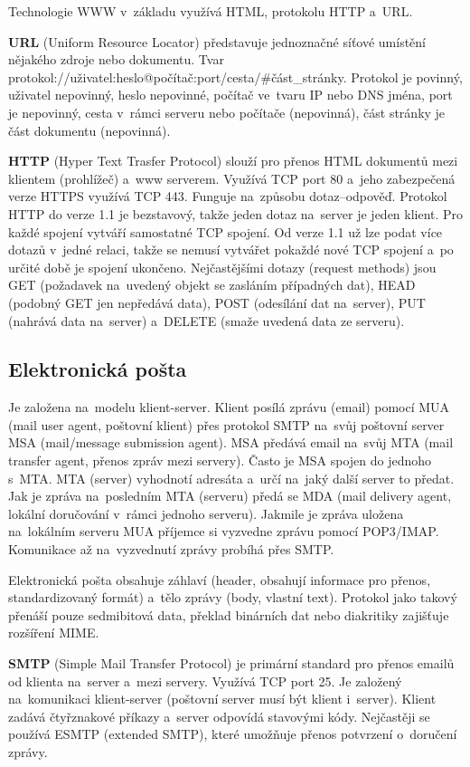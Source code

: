 Technologie WWW v~základu využívá HTML, protokolu HTTP a~URL.

\textbf{URL} (Uniform Resource Locator) představuje jednoznačné síťové umístění nějakého zdroje nebo dokumentu. Tvar protokol://uživatel:heslo@počítač:port/cesta/\#část\_stránky. Protokol je povinný, uživatel nepovinný, heslo nepovinné, počítač ve~tvaru IP nebo DNS jména, port je nepovinný, cesta v~rámci serveru nebo počítače (nepovinná), část stránky je část dokumentu (nepovinná).

\textbf{HTTP} (Hyper Text Trasfer Protocol) slouží pro přenos HTML dokumentů mezi klientem (prohlížeč) a~www serverem. Využívá TCP port 80 a~jeho zabezpečená verze HTTPS využívá TCP 443. Funguje na~způsobu dotaz--odpověď. Protokol HTTP do verze 1.1 je bezstavový, takže jeden dotaz na~server je jeden klient. Pro každé spojení vytváří samostatné TCP spojení. Od verze 1.1 už lze podat více dotazů v~jedné relaci, takže se nemusí vytvářet pokaždé nové TCP spojení a~po určité době je spojení ukončeno. Nejčastějšími dotazy (request methods) jsou GET (požadavek na~uvedený objekt se zasláním případných dat), HEAD (podobný GET jen nepředává data), POST (odesílání dat na~server), PUT (nahrává data na~server) a~DELETE (smaže uvedená data ze serveru).

\subsection{Elektronická pošta}

Je založena na~modelu klient-server. Klient posílá zprávu (email) pomocí MUA (mail user agent, poštovní klient) přes protokol SMTP na~svůj poštovní server MSA (mail/message submission agent). MSA předává email na~svůj MTA (mail transfer agent, přenos zpráv mezi servery). Často je MSA spojen do jednoho s~MTA. MTA (server) vyhodnotí adresáta a~určí na~jaký další server to předat. Jak je zpráva na~posledním MTA (serveru) předá se MDA (mail delivery agent, lokální doručování v~rámci jednoho serveru). Jakmile je zpráva uložena na~lokálním serveru MUA příjemce si vyzvedne zprávu pomocí POP3/IMAP. Komunikace až na~vyzvednutí zprávy probíhá přes SMTP.

Elektronická pošta obsahuje záhlaví (header, obsahují informace pro přenos, standardizovaný formát) a~tělo zprávy (body, vlastní text). Protokol jako takový přenáší pouze sedmibitová data, překlad binárních dat nebo diakritiky zajišťuje rozšíření MIME.

\textbf{SMTP} (Simple Mail Transfer Protocol) je primární standard pro přenos emailů od klienta na~server a~mezi servery. Využívá TCP port 25. Je založený na~komunikaci klient-server (poštovní server musí být klient i~server). Klient zadává čtyřznakové příkazy a~server odpovídá stavovými kódy. Nejčastěji se používá ESMTP (extended SMTP), které umožňuje přenos potvrzení o~doručení zprávy.

